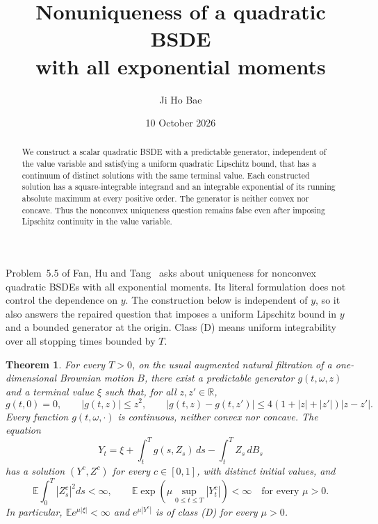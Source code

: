 \documentclass[11pt]{article}
\title{Nonuniqueness of a quadratic BSDE\protect\\ with all exponential moments}
\author{Ji Ho Bae}
\date{10 October 2026}
\newtheorem{theorem}{Theorem}
\begin{document}
\maketitle
\begin{abstract}
We construct a scalar quadratic BSDE with a predictable generator, independent of the value variable and satisfying a uniform quadratic Lipschitz bound, that has a continuum of distinct solutions with the same terminal value. Each constructed solution has a square-integrable integrand and an integrable exponential of its running absolute maximum at every positive order. The generator is neither convex nor concave. Thus the nonconvex uniqueness question remains false even after imposing Lipschitz continuity in the value variable.
\end{abstract}

Problem~5.5 of Fan, Hu and Tang~\cite{FHT} asks about uniqueness for nonconvex quadratic BSDEs with all exponential moments. Its literal formulation does not control the dependence on $y$. The construction below is independent of $y$, so it also answers the repaired question that imposes a uniform Lipschitz bound in $y$ and a bounded generator at the origin. Class (D) means uniform integrability over all stopping times bounded by $T$.

\begin{theorem}\label{main}
For every $T>0$, on the usual augmented natural filtration of a one-dimensional Brownian motion $B$, there exist a predictable generator $g(t,\omega,z)$ and a terminal value $\xi$ such that, for all $z,z'\in\mathbb R$,
\begin{equation}\label{bounds}
 g(t,0)=0,\qquad |g(t,z)|\leq z^2,\qquad
 |g(t,z)-g(t,z')|\leq4(1+|z|+|z'|)|z-z'|.
\end{equation}
Every function $g(t,\omega,\cdot)$ is continuous, neither convex nor concave. The equation
\begin{equation}\label{bsde}
 Y_t=\xi+\int_t^T g(s,Z_s)\,ds-\int_t^T Z_s\,dB_s
\end{equation}
has a solution $(Y^c,Z^c)$ for every $c\in[0,1]$, with distinct initial values, and
\begin{equation}\label{moments}
 \mathbb E\int_0^T|Z^c_s|^2ds<\infty,\qquad
 \mathbb E\exp\!\left(\mu\sup_{0\leq t\leq T}|Y^c_t|\right)<\infty
 \quad\text{for every }\mu>0.
\end{equation}
In particular, $\mathbb E e^{\mu|\xi|}<\infty$ and $e^{\mu|Y^c|}$ is of class (D) for every $\mu>0$.
\end{theorem}
\end{document}
